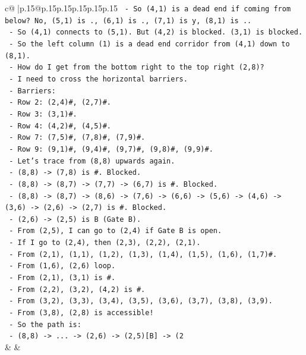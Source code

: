 \documentclass{article}
\begin{document}
{\begin{supertabular}{c@{$\;$}|p{.15\linewidth}@{}p{.15\linewidth}p{.15\linewidth}p{.15\linewidth}p{.15\linewidth}p{.15\linewidth}}
{{{\texttt{      {-} So (4,1) is a dead end if coming from below? No, (5,1) is ., (6,1) is ., (7,1) is y, (8,1) is ..} \\
\texttt{      {-} So (4,1) connects to (5,1). But (4,2) is blocked. (3,1) is blocked.} \\
\texttt{      {-} So the left column (1) is a dead end corridor from (4,1) down to (8,1).} \\
\texttt{      {-} How do I get from the bottom right to the top right (2,8)?} \\
\texttt{      {-} I need to cross the horizontal barriers.} \\
\texttt{      {-} Barriers:} \\
\texttt{        {-} Row 2: (2,4)\#, (2,7)\#.} \\
\texttt{        {-} Row 3: (3,1)\#.} \\
\texttt{        {-} Row 4: (4,2)\#, (4,5)\#.} \\
\texttt{        {-} Row 7: (7,5)\#, (7,8)\#, (7,9)\#.} \\
\texttt{        {-} Row 9: (9,1)\#, (9,4)\#, (9,7)\#, (9,8)\#, (9,9)\#.} \\
\texttt{      {-} Let's trace from (8,8) upwards again.} \\
\texttt{      {-} (8,8) {-}> (7,8) is \#. Blocked.} \\
\texttt{      {-} (8,8) {-}> (8,7) {-}> (7,7) {-}> (6,7) is \#. Blocked.} \\
\texttt{      {-} (8,8) {-}> (8,7) {-}> (8,6) {-}> (7,6) {-}> (6,6) {-}> (5,6) {-}> (4,6) {-}> (3,6) {-}> (2,6) {-}> (2,7) is \#. Blocked.} \\
\texttt{      {-} (2,6) {-}> (2,5) is B (Gate B).} \\
\texttt{      {-} From (2,5), I can go to (2,4) if Gate B is open.} \\
\texttt{      {-} If I go to (2,4), then (2,3), (2,2), (2,1).} \\
\texttt{      {-} From (2,1), (1,1), (1,2), (1,3), (1,4), (1,5), (1,6), (1,7)\#.} \\
\texttt{      {-} From (1,6), (2,6) loop.} \\
\texttt{      {-} From (2,1), (3,1) is \#.} \\
\texttt{      {-} From (2,2), (3,2), (4,2) is \#.} \\
\texttt{      {-} From (3,2), (3,3), (3,4), (3,5), (3,6), (3,7), (3,8), (3,9).} \\
\texttt{      {-} From (3,8), (2,8) is accessible!} \\
\texttt{      {-} So the path is:} \\
\texttt{        {-} (8,8) {-}> ... {-}> (2,6) {-}> (2,5){[}B{]} {-}> (2} \\
            }
        }
    }
    & & \\ \\


\end{supertabular}}
\end{document}
